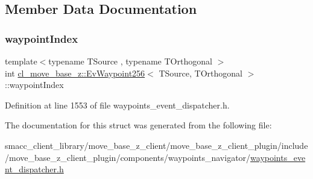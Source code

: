 \subsection{Member Data Documentation}
\mbox{\label{structcl__move__base__z_1_1EvWaypoint256_a15e1ec1788d5bc0d3eacf08e124b22cd}} 
\subsubsection{\texorpdfstring{waypoint\+Index}{waypointIndex}}
{\footnotesize\ttfamily template$<$typename T\+Source , typename T\+Orthogonal $>$ \\
int \hyperlink{structcl__move__base__z_1_1EvWaypoint256}{cl\+\_\+move\+\_\+base\+\_\+z\+::\+Ev\+Waypoint256}$<$ T\+Source, T\+Orthogonal $>$\+::waypoint\+Index}



Definition at line 1553 of file waypoints\+\_\+event\+\_\+dispatcher.\+h.



The documentation for this struct was generated from the following file\+:\begin{DoxyCompactItemize}
\item 
smacc\+\_\+client\+\_\+library/move\+\_\+base\+\_\+z\+\_\+client/move\+\_\+base\+\_\+z\+\_\+client\+\_\+plugin/include/move\+\_\+base\+\_\+z\+\_\+client\+\_\+plugin/components/waypoints\+\_\+navigator/\hyperlink{waypoints__event__dispatcher_8h}{waypoints\+\_\+event\+\_\+dispatcher.\+h}\end{DoxyCompactItemize}

